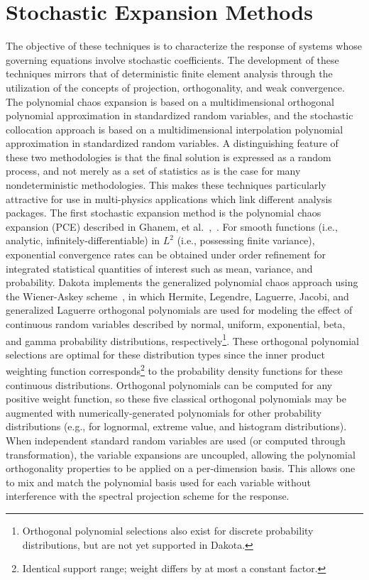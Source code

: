 \section{Stochastic Expansion Methods}\label{uq:expansion}


The objective of these techniques is to characterize the response of
systems whose governing equations involve stochastic coefficients. The
development of these techniques mirrors that of deterministic finite
element analysis through the utilization of the concepts of
projection, orthogonality, and weak convergence. The polynomial chaos
expansion is based on a multidimensional orthogonal polynomial
approximation in standardized random variables, and the stochastic
collocation approach is based on a multidimensional interpolation
polynomial approximation in standardized random variables. A
distinguishing feature of these two methodologies is that the final
solution is expressed as a random process, and not merely as a set of
statistics as is the case for many nondeterministic methodologies.
This makes these techniques particularly attractive for use in
multi-physics applications which link different analysis packages.
The first stochastic expansion method is the polynomial chaos
expansion (PCE) described in Ghanem, et
al.~\cite{Gha99},~\cite{Gha91}. For smooth functions (i.e., analytic,
infinitely-differentiable) in $L^2$ (i.e., possessing finite
variance), exponential convergence rates can be obtained under order
refinement for integrated statistical quantities of interest such as
mean, variance, and probability. Dakota implements the generalized
polynomial chaos approach using the Wiener-Askey
scheme~\cite{XiuKarn02}, in which Hermite, Legendre, Laguerre, Jacobi,
and generalized Laguerre orthogonal polynomials are used for modeling
the effect of continuous random variables described by normal,
uniform, exponential, beta, and gamma probability distributions,
respectively\footnote{Orthogonal polynomial selections also exist for
discrete probability distributions, but are not yet supported in
Dakota.}. These orthogonal polynomial selections are optimal for
these distribution types since the inner product weighting function
corresponds\footnote{Identical support range; weight
differs by at most a constant factor.} to the probability
density functions for these continuous distributions. Orthogonal polynomials
can be computed for any positive weight function, so these five
classical orthogonal polynomials may be augmented with
numerically-generated polynomials for other probability distributions
(e.g., for lognormal, extreme value, and histogram distributions).
When independent standard random variables are used (or computed
through transformation), the variable expansions are uncoupled,
allowing the polynomial orthogonality properties to be applied on a
per-dimension basis. This allows one to mix and match the polynomial
basis used for each variable without interference with the spectral
projection scheme for the response. 

